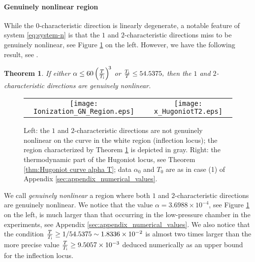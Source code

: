 \documentclass[10pt,a4paper]{article}
\newtheorem{theorem}{Theorem}[section]
\numberwithin{equation}{section}
\newcommand{\Ti}{T_{\rm i}}
\begin{document}
\paragraph{Genuinely nonlinear region}
While the $0$-characteristic direction is linearly degenerate, a notable feature of system \eqref{eq:system-n} is that the $1$ and $2$-characteristic directions miss to be genuinely nonlinear, see Figure \ref{f:GNL} on the left. However, we have the following result, see \cite[Th. 4.1]{Asakura-Corli_ionized}.
%
\begin{theorem}\label{thm:genuine nonlinearity}
If either $\alpha \leq 60 \left(\frac{T}{\Ti}\right)^{\! 3}$ or $\frac{\Ti}{T} \leq 54.5375,$
then the $1$ and $2$-characteristic directions are genuinely nonlinear.
\end{theorem} 
%
\begin{figure}[hbt]
\begin{tabular}{cc}
\texttt{[image: Ionization\_GN\_Region.eps]}
&
\texttt{[image: x\_HugoniotT2.eps]}
\end{tabular}
\caption{Left: the $1$ and $2$-characteristic directions are not genuinely nonlinear on the curve in the white region (inflection locus); the region characterized by Theorem \ref{thm:genuine nonlinearity} is depicted in gray. Right: the thermodynamic part of the Hugoniot locus, see Theorem \ref{thm:Hugoniot curve alpha T}; data $\alpha_0$ and $T_0$ are as in case (1) of Appendix \ref{sec:appendix_numerical_values}.
}
\label{f:GNL}
\end{figure}
%
We call {\em genuinely nonlinear} a region where both $1$ and $2$-characteristic directions are genuinely nonlinear. We notice that the value $\alpha= 3.6988\times 10^{-4}$, see Figure \ref{f:GNL} on the left, is much larger than that occurring in the low-pressure chamber in the experiments, see Appendix \ref{sec:appendix_numerical_values}. We also notice that the condition $\frac{T}{T_{\rm i}}\ge 1/54.5375\sim 1.8336\times 10^{-2}$ is almost two times larger than the more precise value 
$\frac{T}{T_{\rm i}}\ge 9.5057\times 10^{-3}$ deduced numerically as an upper bound for the inflection locus.
\end{document}
